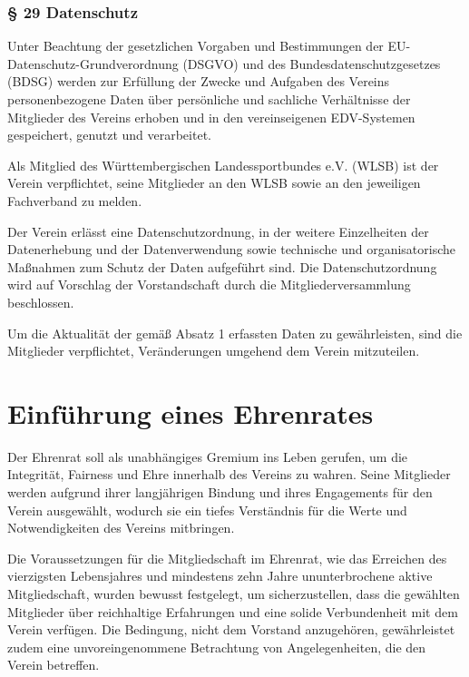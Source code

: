 \documentclass[10pt,a4paper,parskip=half]{scrartcl}
\newcommand{\change}[1]{
  \begin{adjustwidth}{20pt}{20pt}
    #1
  \end{adjustwidth}
}
\begin{document}
\change{
  \subsubsection*{§ 29 Datenschutz}

  Unter Beachtung der gesetzlichen Vorgaben und Bestimmungen der EU\--Daten\-schutz\--Grund\-verordnung (DSGVO) und des Bundes\-datenschutz\-gesetzes (BDSG) werden zur Erfüllung der Zwecke und Aufgaben des Vereins personenbezogene Daten über persönliche und sachliche Verhältnisse der Mitglieder des Vereins erhoben und in den vereinseigenen EDV-Systemen gespeichert, genutzt und verarbeitet.

  Als Mitglied des Württembergischen Landessportbundes e.V. (WLSB) ist der Verein verpflichtet, seine Mitglieder an den WLSB sowie an den jeweiligen Fachverband zu melden.

  Der Verein erlässt eine Datenschutzordnung, in der weitere Einzelheiten der Datenerhebung und der Datenverwendung sowie technische und organisatorische Maßnahmen zum Schutz der Daten aufgeführt sind. Die Datenschutzordnung wird auf Vorschlag der Vorstandschaft durch die Mitgliederversammlung beschlossen.

  Um die Aktualität der gemäß Absatz 1 erfassten Daten zu gewährleisten,
  sind die Mitglieder verpflichtet, Veränderungen umgehend dem Verein mitzuteilen.
}
\clearpage

\section{Einführung eines Ehrenrates}
Der Ehrenrat soll als unabhängiges Gremium ins Leben gerufen, um die Integrität, Fairness und Ehre innerhalb des Vereins zu wahren. Seine Mitglieder werden aufgrund ihrer langjährigen Bindung und ihres Engagements für den Verein ausgewählt, wodurch sie ein tiefes Verständnis für die Werte und Notwendigkeiten des Vereins mitbringen.

Die Voraussetzungen für die Mitgliedschaft im Ehrenrat, wie das Erreichen des vierzigsten Lebensjahres und mindestens zehn Jahre ununterbrochene aktive Mitgliedschaft, wurden bewusst festgelegt, um sicherzustellen, dass die gewählten Mitglieder über reichhaltige Erfahrungen und eine solide Verbundenheit mit dem Verein verfügen. Die Bedingung, nicht dem Vorstand anzugehören, gewährleistet zudem eine unvoreingenommene Betrachtung von Angelegenheiten, die den Verein betreffen.
\end{document}
